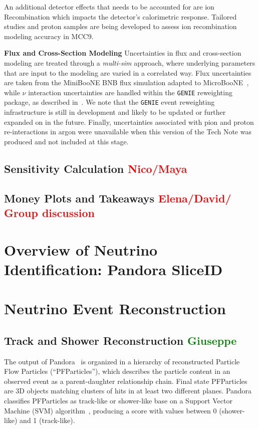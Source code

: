 \documentclass[a4paper]{article}
\begin{document}
An additional detector effects that needs to be accounted for are ion Recombination which impacts the detector's calorimetric response. Tailored studies and proton samples are being developed to assess ion recombination modeling accuracy in MCC9.
\par \noindent \textbf{Flux and Cross-Section Modeling} Uncertainties in flux and cross-section modeling are treated through a \emph{multi-sim} approach, where underlying parameters that are input to the modeling are varied in a correlated way. Flux uncertainties are taken from the MiniBooNE BNB flux simulation adapted to MicroBooNE~\cite{bib:fluxmcc9}, while $\nu$ interaction uncertainties are handled within the \texttt{GENIE} reweighting package, as described in~\cite{bib:geniesupportnote}. We note that the \texttt{GENIE} event reweighting infrastructure is still in development and likely to be updated or further expanded on in the future. Finally, uncertainties associated with pion and proton re-interactions in argon were unavailable when this version of the Tech Note was produced and not included at this stage.

\subsection{Sensitivity Calculation  \textcolor{red}{Nico/Maya}}
\subsection{Money Plots and Takeaways \textcolor{red}{Elena/David/ Group discussion}}

\newpage

\section{Overview of Neutrino Identification: Pandora SliceID}




\newpage

\section{Neutrino Event Reconstruction}

\subsection{Track and Shower Reconstruction \textcolor{green}{Giuseppe}}
\label{sec:tkshreco}
The output of Pandora~\cite{bib:pandoraub} is organized in a hierarchy of reconstructed Particle Flow Particles (``PFParticles''), which describes the particle content in an observed event as a parent-daughter relationship chain. Final state PFParticles are 3D objects matching clusters of hits in at least two different planes.
Pandora classifies PFParticles as track-like or shower-like base on a Support Vector Machine (SVM) algorithm~\cite{bib:tkshsvm}, producing a score with values between 0 (shower-like) and 1 (track-like).
\end{document}
